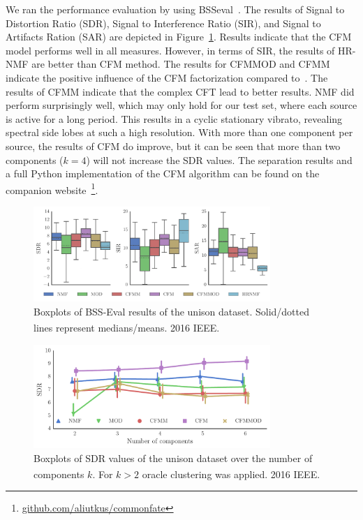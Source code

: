 We ran the performance evaluation by using BSSeval~\cite{vincent06}. The results of Signal to Distortion
Ratio (SDR), Signal to Interference Ratio (SIR), and Signal to Artifacts Ration (SAR) are depicted in Figure~\ref{fig:boxplot_overall}. 
Results indicate that the CFM model performs well in all measures. 
However, in terms of SIR, the results of HR-NMF are better than CFM method. The results for CFMMOD and CFMM indicate the positive influence of the CFM factorization compared to~\cite{barker13}.
The results of CFMM indicate that the complex CFT lead to better results. NMF did perform surprisingly well, which may only hold for our test set, where each source is active for a long period. This results in a cyclic stationary vibrato, revealing spectral side lobes at such a high resolution. With more than one component per source, the results of CFM do improve, but it can be seen that more than two components ($k=4$) will not increase the SDR values. The separation results and a full Python implementation of the CFM algorithm can be found on the companion website~\footnote{\url{github.com/aliutkus/commonfate}}.

\begin{figure}[ht!]
\centering
        \includegraphics[width=0.8\textwidth]{Chapters/06_Separation_Unknown/figures/cfm_boxplot.pdf}
\caption{Boxplots of BSS-Eval results of the unison dataset. Solid/dotted lines represent medians/means. \textsuperscript{\textregistered}2016 IEEE.}
\label{fig:boxplot_overall}
\end{figure}

\begin{figure}[ht!]
\centering
        \includegraphics[width=0.8\textwidth]{Chapters/06_Separation_Unknown/figures/iterations.pdf}
\caption{Boxplots of SDR values of the unison dataset over the number of components $k$. For $k>2$ oracle clustering was applied. \textsuperscript{\textregistered}2016 IEEE.}
\label{fig:iterations}
\end{figure}

